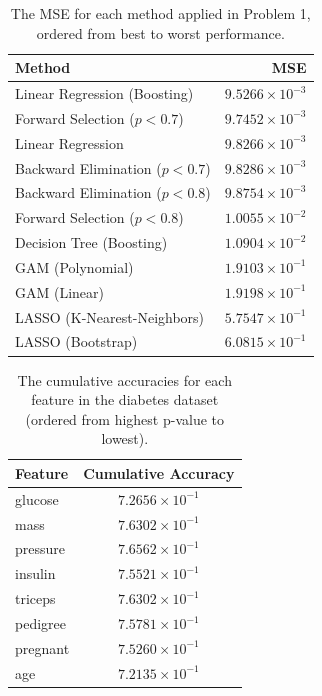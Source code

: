 \documentclass[twoside,twocolumn,10pt]{revtex4-1}
\begin{document}
	\begin{table}[H]
	\center
		\begin{tabular}{l r}
		\textbf{Method} & \textbf{MSE} \\ 
		\hline
		Linear Regression (Boosting) & $9.5266 \times 10^{-3}$\\
		Forward Selection ($p < 0.7$) & $9.7452 \times 10^{-3}$\\
		Linear Regression & $9.8266 \times 10^{-3}$\\
		Backward Elimination ($p < 0.7$) & $9.8286 \times 10^{-3}$\\
		Backward Elimination ($p < 0.8$) & $9.8754 \times 10^{-3}$\\
		Forward Selection ($p < 0.8$) & $1.0055 \times 10^{-2}$\\
		Decision Tree (Boosting) & $1.0904 \times 10^{-2}$ \\
		GAM (Polynomial) & $1.9103 \times 10^{-1}$\\
		GAM (Linear) & $1.9198 \times 10^{-1}$\\
		LASSO (K-Nearest-Neighbors) & $5.7547 \times 10^{-1}$\\
		LASSO (Bootstrap) & $6.0815 \times 10^{-1}$
		\end{tabular}
		\caption{The MSE for each method applied in Problem 1, ordered from best to worst performance.\label{table_8}}
	\end{table}	

	\begin{table}[H]
	\center
		\begin{tabular}{l c}	
		\textbf{Feature} & \textbf{Cumulative Accuracy} \\
		\hline
		glucose & $7.2656 \times 10^{-1}$ \\
		mass & $7.6302 \times 10^{-1}$ \\
		pressure & $7.6562 \times 10^{-1}$ \\
		insulin & $7.5521 \times 10^{-1}$ \\
		triceps & $7.6302 \times 10^{-1}$ \\
		pedigree & $7.5781 \times 10^{-1}$ \\
		pregnant & $7.5260 \times 10^{-1}$ \\
		age & $7.2135 \times 10^{-1} $
		\end{tabular}
		\caption{The cumulative accuracies for each feature in the diabetes dataset (ordered from highest p-value to lowest).\label{table_9}}
	\end{table}
	
\end{document}
